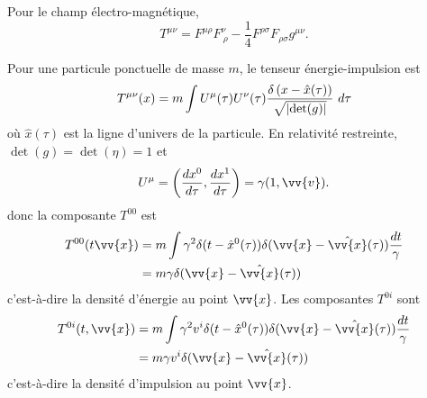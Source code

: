 \documentclass[a4paper,11pt]{report}
\begin{document}
            \begin{exmp}
                Pour le champ électro-magnétique, 
                \begin{equation}
                    T^{\mu\nu} = F^{\mu\rho}F^{\nu}_{~\rho}-\frac{1}{4}F^{\rho\sigma}F_{\rho\sigma}g^{\mu\nu}.
                \end{equation}
            \end{exmp}
            
            \begin{exmp}
                Pour une particule ponctuelle de masse $m$, le tenseur énergie-impulsion est
                \begin{equation}
                    T^{\mu\nu}(x) = m\int U^\mu(\tau)U^\nu(\tau)\frac{\delta\left(x-\hat{x}(\tau)\right)}{\sqrt{\abs{\det(g)}}} ~d\tau
                \end{equation}
                où $\hat{x}(\tau)$ est la ligne d'univers de la particule. En relativité restreinte, $\det(g) = \det(\eta) = 1$ et
                \begin{equation}
                    U^\mu = \left( \frac{dx^0}{d\tau},\frac{dx^1}{d\tau} \right) = \gamma(1,\vv{v}).
                \end{equation}
                donc la composante $T^{00}$ est
                \begin{align}
                    T^{00}(t\vv{x}) &= m\int\gamma^2 \delta(t-\hat{x}^0(\tau))\delta(\vv{x}-\hat{\vv{x}}(\tau)) \frac{dt}{\gamma} \\
                    &= m\gamma \delta(\vv{x}-\hat{\vv{x}}(\tau))
                \end{align}
                c'est-à-dire la densité d'énergie au point $\vv{x}$.
                Les composantes $T^{0i}$ sont
                \begin{align}
                    T^{0i}(t,\vv{x}) &= m\int\gamma^2 v^i\delta(t-\hat{x}^0(\tau))\delta(\vv{x}-\hat{\vv{x}}(\tau)) \frac{dt}{\gamma} \\
                    &= m\gamma v^i \delta(\vv{x}-\hat{\vv{x}}(\tau))
                \end{align}
                c'est-à-dire la densité d'impulsion au point $\vv{x}$.\\
                

\end{exmp}
\end{document}
